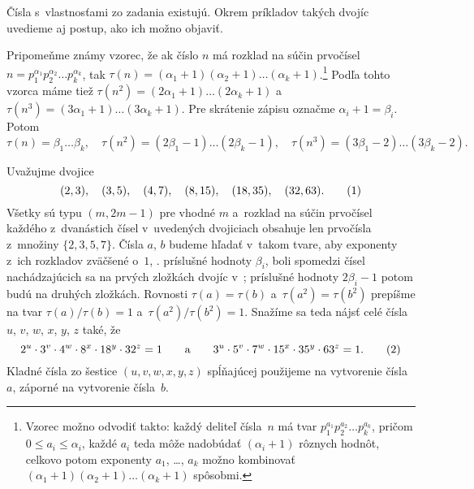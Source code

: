 {%
Čísla s~vlastnosťami zo zadania existujú. Okrem príkladov takých dvojíc uvedieme aj postup, ako ich možno objaviť.

Pripomeňme známy vzorec, že ak číslo $n$ má rozklad na súčin prvočísel $n=p_1^{\alpha_1}p_2^{\alpha_2}\dots p_k^{\alpha_k}$, tak $\tau(n)=(\alpha_1+1)(\alpha_2+1)\dots(\alpha_k+1)$.\footnote{Vzorec možno odvodiť takto: každý deliteľ čísla~$n$ má tvar $p_1^{a_1}p_2^{a_2}\dots p_k^{a_k}$, pričom $0\le a_i\le\alpha_i$, každé $a_i$ teda môže nadobúdať $(\alpha_i+1)$ rôznych hodnôt, celkovo potom exponenty $a_1$, \dots, $a_k$ možno kombinovať $(\alpha_1+1)(\alpha_2+1)\dots(\alpha_k+1)$ spôsobmi.} Podľa tohto vzorca máme tiež $\tau(n^2)=(2\alpha_1+1)\dots(2\alpha_k+1)$ a~$\tau(n^3)=(3\alpha_1+1)\dots(3\alpha_k+1)$. Pre skrátenie zápisu označme $\alpha_i+1=\beta_i$. Potom
$$
\tau(n)=\beta_1\dots \beta_k,\quad
\tau(n^2)=(2\beta_1-1)\dots(2\beta_k-1),\quad
\tau(n^3)=(3\beta_1-2)\dots(3\beta_k-2).
$$

Uvažujme dvojice
$$
(2,3),\quad(3,5),\quad(4,7),\quad(8,15),\quad(18,35),\quad(32,63).
\tag1
$$
Všetky sú typu $(m,2m-1)$ pre vhodné $m$ a~rozklad na súčin prvočísel každého z~dvanástich čísel v~uvedených dvojiciach obsahuje len prvočísla z~množiny $\{2,3,5,7\}$. Čísla $a$, $b$ budeme hľadať v~takom tvare, aby exponenty z~ich rozkladov zväčšené o~$1$, \tj. príslušné hodnoty $\beta_i$, boli spomedzi čísel nachádzajúcich sa na prvých zložkách dvojíc v~; príslušné hodnoty $2\beta_i-1$ potom budú na druhých zložkách. Rovnosti $\tau(a)=\tau(b)$ a~$\tau(a^2)=\tau(b^2)$ prepíšme na tvar $\tau(a)/\tau(b)=1$ a~$\tau(a^2)/\tau(b^2)=1$. Snažíme sa teda nájsť celé čísla $u$, $v$, $w$, $x$, $y$, $z$ také, že
$$
2^u\cdot3^v\cdot4^w\cdot8^x\cdot18^y\cdot32^z=1\qquad\text{a}\qquad 3^u\cdot5^v\cdot7^w\cdot15^x\cdot35^y\cdot63^z=1.
\tag2
$$
Kladné čísla zo šestice $(u,v,w,x,y,z)$ spĺňajúcej  použijeme na vytvorenie čísla~$a$, záporné na vytvorenie čísla~$b$.

}
